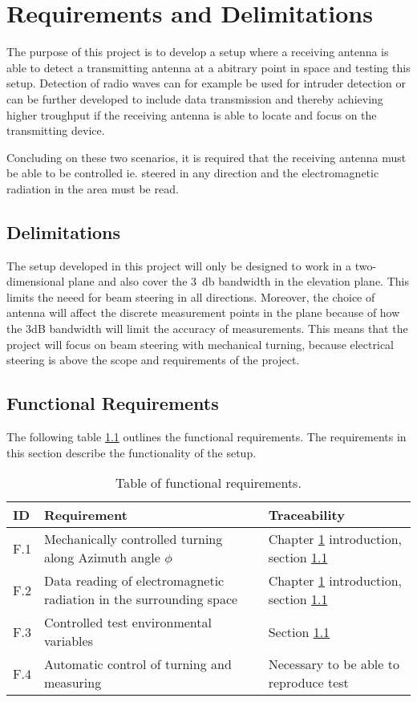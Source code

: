 \chapter{Requirements and Delimitations} \label{ch:req}
The purpose of this project is to develop a setup where a receiving antenna is able to detect a transmitting antenna at a abitrary point in space and testing this setup. Detection of radio waves can for example be used for intruder detection or can be further developed to include data transmission and thereby achieving higher troughput if the receiving antenna is able to locate and focus on the transmitting device. 

Concluding on these two scenarios, it is required that the receiving antenna must be able to be controlled ie. steered in any direction and the electromagnetic radiation in the area must be read. 

\section{Delimitations} \label{sec:delimitations}
The setup developed in this project will only be designed to work in a two-dimensional plane and also cover the \SI{3}{\decibel} bandwidth in the elevation plane. This limits the neeed for beam steering in all directions. Moreover, the choice of antenna will affect the discrete measurement points in the plane because of how the 3dB bandwidth will limit the accuracy of measurements. This means that the project will focus on beam steering with mechanical turning, because electrical steering is above the scope and requirements of the project.

\section{Functional Requirements}
The following table \ref{tab:func_req} outlines the functional requirements. The requirements in this section describe the functionality of the setup.
\begin{table}[H]
    \centering
    \begin{tabular}{p{}|>{\raggedright}p{}|p{}}
        \textbf{ID} & \textbf{Requirement} & \textbf{Traceability} \\
        \hline
        \hline
        F.1 & Mechanically controlled turning along Azimuth angle $\phi$ & Chapter \ref{ch:req} introduction, section \ref{sec:delimitations} \\
        F.2 & Data reading of electromagnetic radiation in the surrounding space & Chapter \ref{ch:req} introduction, section \ref{sec:delimitations} \\
        F.3 & Controlled test environmental variables & Section \ref{sec:delimitations} \\
        F.4 & Automatic control of turning and measuring & Necessary to be able to reproduce test \\
    \end{tabular}
    \caption{Table of functional requirements.}
    \label{tab:func_req}
\end{table}

